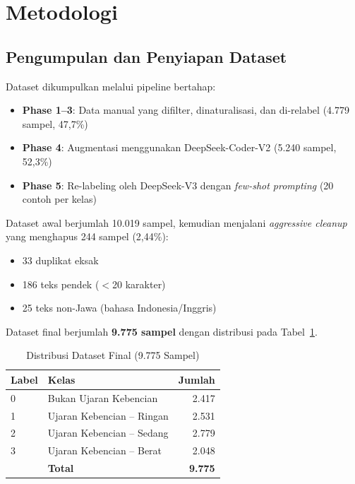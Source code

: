 \documentclass[10pt,twocolumn]{article}
\begin{document}
\section{Metodologi}

\subsection{Pengumpulan dan Penyiapan Dataset}

Dataset dikumpulkan melalui pipeline bertahap:
\begin{itemize}[leftmargin=*,nosep]
    \item \textbf{Phase 1--3}: Data manual yang difilter, dinaturalisasi, dan di-relabel (4.779 sampel, 47,7\%)
    \item \textbf{Phase 4}: Augmentasi menggunakan DeepSeek-Coder-V2 (5.240 sampel, 52,3\%)
    \item \textbf{Phase 5}: Re-labeling oleh DeepSeek-V3 dengan \textit{few-shot prompting} (20 contoh per kelas)
\end{itemize}

Dataset awal berjumlah 10.019 sampel, kemudian menjalani \textit{aggressive cleanup} yang menghapus 244 sampel (2,44\%):
\begin{itemize}[leftmargin=*,nosep]
    \item 33 duplikat eksak
    \item 186 teks pendek ($<$20 karakter)
    \item 25 teks non-Jawa (bahasa Indonesia/Inggris)
\end{itemize}

Dataset final berjumlah \textbf{9.775 sampel} dengan distribusi pada Tabel~\ref{tab:dataset}.

\begin{table}[H]
\centering
\caption{Distribusi Dataset Final (9.775 Sampel)}
\label{tab:dataset}
\begin{tabular}{llr}
\toprule
\textbf{Label} & \textbf{Kelas} & \textbf{Jumlah} \\
\midrule
0 & Bukan Ujaran Kebencian & 2.417 \\
1 & Ujaran Kebencian -- Ringan & 2.531 \\
2 & Ujaran Kebencian -- Sedang & 2.779 \\
3 & Ujaran Kebencian -- Berat & 2.048 \\
\midrule
  & \textbf{Total} & \textbf{9.775} \\
\bottomrule
\end{tabular}
\end{table}
\end{document}
